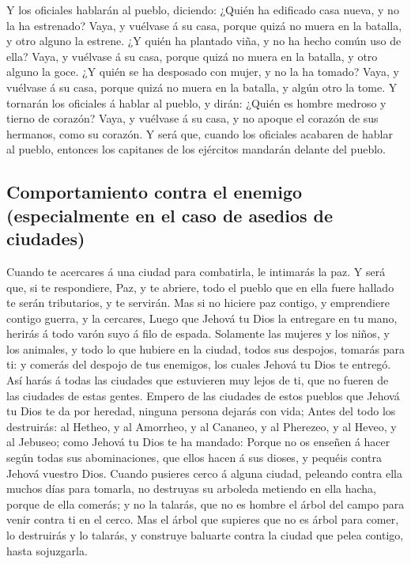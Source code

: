  Y los oficiales hablarán al pueblo, diciendo: ¿Quién ha
edificado casa nueva, y no la ha estrenado? Vaya, y vuélvase á su casa,
porque quizá no muera en la batalla, y otro alguno la estrene.
 ¿Y quién ha plantado viña, y no ha hecho común uso de
ella? Vaya, y vuélvase á su casa, porque quizá no muera en la batalla, y
otro alguno la goce.  ¿Y quién se ha desposado con mujer,
y no la ha tomado? Vaya, y vuélvase á su casa, porque quizá no muera en
la batalla, y algún otro la tome.  Y tornarán los
oficiales á hablar al pueblo, y dirán: ¿Quién es hombre medroso y tierno
de corazón? Vaya, y vuélvase á su casa, y no apoque el corazón de sus
hermanos, como su corazón.  Y será que, cuando los
oficiales acabaren de hablar al pueblo, entonces los capitanes de los
ejércitos mandarán delante del pueblo.

\hypertarget{comportamiento-contra-el-enemigo-especialmente-en-el-caso-de-asedios-de-ciudades}{%
\subsection{Comportamiento contra el enemigo (especialmente en el caso
de asedios de
ciudades)}\label{comportamiento-contra-el-enemigo-especialmente-en-el-caso-de-asedios-de-ciudades}}

 Cuando te acercares á una ciudad para combatirla, le
intimarás la paz.  Y será que, si te respondiere, Paz, y
te abriere, todo el pueblo que en ella fuere hallado te serán
tributarios, y te servirán.  Mas si no hiciere paz
contigo, y emprendiere contigo guerra, y la cercares, 
Luego que Jehová tu Dios la entregare en tu mano, herirás á todo varón
suyo á filo de espada.  Solamente las mujeres y los
niños, y los animales, y todo lo que hubiere en la ciudad, todos sus
despojos, tomarás para ti: y comerás del despojo de tus enemigos, los
cuales Jehová tu Dios te entregó.  Así harás á todas las
ciudades que estuvieren muy lejos de ti, que no fueren de las ciudades
de estas gentes.  Empero de las ciudades de estos pueblos
que Jehová tu Dios te da por heredad, ninguna persona dejarás con vida;
 Antes del todo los destruirás: al Hetheo, y al Amorrheo,
y al Cananeo, y al Pherezeo, y al Heveo, y al Jebuseo; como Jehová tu
Dios te ha mandado:  Porque no os enseñen á hacer según
todas sus abominaciones, que ellos hacen á sus dioses, y pequéis contra
Jehová vuestro Dios.  Cuando pusieres cerco á alguna
ciudad, peleando contra ella muchos días para tomarla, no destruyas su
arboleda metiendo en ella hacha, porque de ella comerás; y no la
talarás, que no es hombre el árbol del campo para venir contra ti en el
cerco.  Mas el árbol que supieres que no es árbol para
comer, lo destruirás y lo talarás, y construye baluarte contra la ciudad
que pelea contigo, hasta sojuzgarla.

